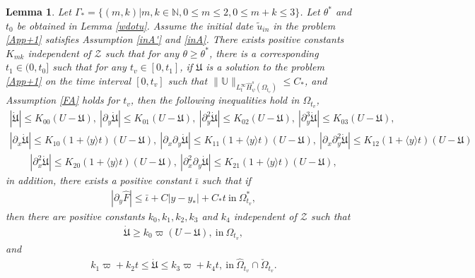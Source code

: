 \documentclass{amsart}
\numberwithin{equation}{section}
\newtheorem{lemma}{Lemma}[section]
\newcommand\y{{{\langle y \rangle}}}
\begin{document}
\begin{lemma}\label{sdotu}
Let $\Gamma_{*}=\{(m,k)|m,k\in\mathbb{N}, 0\leq m\leq 2, 0\leq m+k\leq3\}$.
Let $\theta^{*}$ and $t_{0}$ be obtained in Lemma \ref{wdotu}.
Assume the initial date $\tilde{u}_{in}$ in the problem \eqref{App+1} satisfies Assumption \ref{inA'} and \ref{inA}.
There exists positive constants $K_{mk}$ independent of $\mathcal{Z}$ such that for any $\theta\geq\theta^{*}$, there is a corresponding $t_{1}\in(0,t_{0}]$ such that for any $t_{v}\in[0,t_{1}]$, if $\mathfrak{U}$ is a solution to the problem \eqref{App+1} on the time interval $[0,t_{v}]$ such that
$\|\mathbb{U}\|_{L_{t}^{\infty}\hat{H}_{\psi}^{s}(\Omega_{t_{v}})}\leq C_{*}$,
and Assumption \ref{FA} holds for $t_{v}$, then the following inequalities hold in $\Omega_{t_{v}}$,
\begin{align}\label{dotul}
|\dot{\mathfrak{U}}|\leq K_{00}(U-\mathfrak{U}),~
|\partial_{y}\dot{\mathfrak{U}}|\leq K_{01}(U-\mathfrak{U}),~
|\partial_{y}^{2}\dot{\mathfrak{U}}|\leq K_{02}(U-\mathfrak{U}),~
|\partial_{y}^{3}\dot{\mathfrak{U}}|\leq K_{03}(U-\mathfrak{U}),
\end{align}
\begin{align}\label{dotux1}
|\partial_{x}\dot{\mathfrak{U}}|\leq K_{10}(1+\y t)(U-\mathfrak{U}),~
|\partial_{x}\partial_{y}\dot{\mathfrak{U}}|\leq K_{11}(1+\y t)(U-\mathfrak{U}),~
|\partial_{x}\partial_{y}^{2}\dot{\mathfrak{U}}|\leq K_{12}(1+\y t)(U-\mathfrak{U})
\end{align}
\begin{align}\label{dotux2}
|\partial_{x}^{2}\dot{\mathfrak{U}}|\leq K_{20}(1+\y t)(U-\mathfrak{U}),~
|\partial_{x}^{2}\partial_{y}\dot{\mathfrak{U}}|\leq K_{21}(1+\y t)(U-\mathfrak{U}),
\end{align}
in addition, there exists a positive constant $\bar{\iota}$ such that if
\begin{align}\label{Fe}
|\partial_{y}\hat{F}|\leq \bar{\iota}+C|y-y_{*}|+C_{*}t~\text{in}~\Omega_{t_{v}}^{*},
\end{align}
then there are positive constants $k_{0},k_{1},k_{2},k_{3}$ and $k_{4}$ independent of $\mathcal{Z}$ such that
\begin{align}\label{dotug}
\dot{\mathfrak{U}}\geq k_{0}\varpi(U-\mathfrak{U}),~\text{in}~\Omega_{t_{v}},
\end{align}
and
\begin{align}\label{dotub}
k_{1}\varpi+k_{2}t\leq \dot{\mathfrak{U}}\leq k_{3}\varpi+k_{4}t,~\text{in}~\hat{\Omega}_{t_{v}}\cap\check{\Omega}_{t_{v}}.
\end{align}
\end{lemma}
\end{document}
